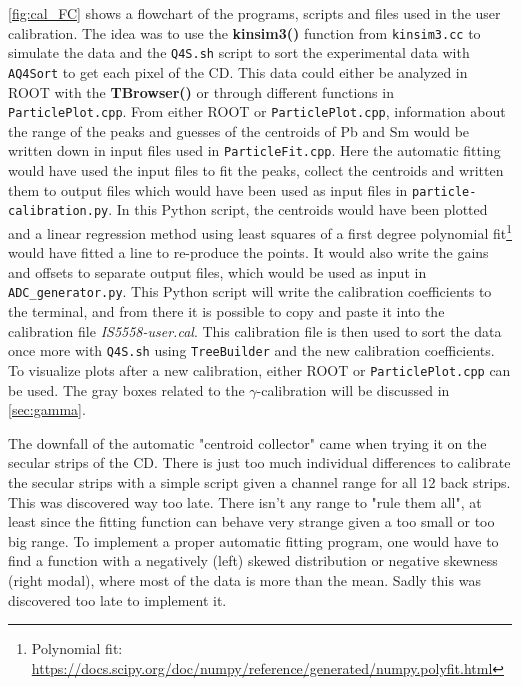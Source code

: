 \documentclass[twoside,english]{uiofysmaster/uiofysmaster}
\newcommand{\ga}{$\gamma$}
\begin{document}
\autoref{fig:cal_FC} shows a flowchart of the programs, scripts and files used in the user calibration. 
The idea was to use the \textbf{kinsim3()} function from \texttt{kinsim3.cc} to simulate the data and the \texttt{Q4S.sh} script to sort the experimental data with \texttt{AQ4Sort} to get each pixel of the CD. 
This data could either be analyzed in ROOT with the \textbf{TBrowser()} or through different functions in \texttt{ParticlePlot.cpp}. 
From either ROOT or \texttt{ParticlePlot.cpp}, information about the range of the peaks and guesses of the centroids of Pb and Sm would be written down in input files used in \texttt{ParticleFit.cpp}. 
Here the automatic fitting would have used the input files to fit the peaks, collect the centroids and written them to output files which would have been used as input files in \texttt{particle-calibration.py}. 
In this Python script, the centroids would have been plotted and a linear regression method using least squares of a first degree polynomial fit\footnote{Polynomial fit: \url{https://docs.scipy.org/doc/numpy/reference/generated/numpy.polyfit.html}} would have fitted a line to re-produce the points. 
It would also write the gains and offsets to separate output files, which would be used as input in \texttt{ADC\_generator.py}. 
This Python script will write the calibration coefficients to the terminal, and from there it is possible to copy and paste it into the calibration file \textit{IS5558-user.cal}. 
This calibration file is then used to sort the data once more with \texttt{Q4S.sh} using \texttt{TreeBuilder} and the new calibration coefficients.
To visualize plots after a new calibration, either ROOT or \texttt{ParticlePlot.cpp} can be used. 
The gray boxes related to the \ga-calibration will be discussed in \autoref{sec:gamma}.

The downfall of the automatic "centroid collector" came when trying it on the secular strips of the CD. 
There is just too much individual differences to calibrate the secular strips with a simple script given a channel range for all 12 back strips. 
This was discovered way too late. 
There isn't any range to "rule them all", at least since the fitting function can behave very strange given a too small or too big range.
To implement a proper automatic fitting program, one would have to find a function with a negatively (left) skewed distribution or negative skewness (right modal), where most of the data is more than the mean. 
Sadly this was discovered too late to implement it. 
\end{document}
